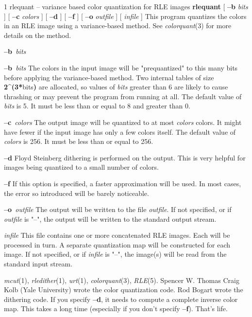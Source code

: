%
%
%
 1
rlequant -- variance based color quantization for RLE images
{\bf rlequant}
[
{\bf --b}
{\it bits}
] [
{\bf --c}
{\it colors}
] [
{\bf --d}
] [
{\bf --f}
] [
{\bf --o}
{\it outfile}
] [ 
{\it infile}
] 
This program quantizes the colors in an RLE image using a
variance-based method.  See 
{\it colorquant}{\rm (3)}
for more details on the method.
\begin{TPlist}{{\bf --b}{\it \ bits}
}
\item[{{\bf --b}{\it \ bits}
}]
The colors in the input image will be "prequantized" to this many bits
before applying the variance-based method.  Two internal tables of
size 
{\bf 2\^{}(3*}{\rm bits}{\bf )}
are allocated, so values of
{\it bits}
greater than 6 are likely to cause thrashing or may prevent the
program from running at all.  The default value of
{\it bits}
is 5.  It must be less than or equal to 8 and greater than 0.
\item[{{\bf --c}{\it \ colors}
}]
The output image will be quantized to at most
{\it colors}
colors.  It might have fewer if the input image has only a few colors
itself.  The default value of
{\it colors}
is 256.  It must be less than or equal to 256.
\item[{{\bf --d}}]
Floyd Steinberg dithering is performed on the output.  This is very helpful
for images being quantized to a small number of colors.
\item[{{\bf --f}}]
If this option is specified, a faster approximation will be used.  In
most cases, the error so introduced will be barely noticeable.
\item[{{\bf --o}{\it \ outfile}
}]
The output will be written to the file
{\it outfile}{\rm .}
If not specified, or if
{\it outfile}
is "--", the output will be written to the standard output stream.
\item[{{\it infile}}]
This file contains one or more concatenated RLE images.  Each will be
processed in turn.  A separate quantization map will be constructed
for each image.  If not specified, or if
{\it infile}
is "--", the image(s) will be read from the standard input stream.
\end{TPlist}
{\it mcut}{\rm (1),}
{\it rledither}{\rm (1),}
{\it urt}{\rm (1),}
{\it colorquant}{\rm (3),}
{\it RLE}{\rm (5).}
Spencer W. Thomas
\nwl
Craig Kolb (Yale University) wrote the color quantization code.
\nwl
Rod Bogart wrote the dithering code.
If you specify 
{\bf --d}{\rm ,}
it needs to compute a complete inverse color map.  This takes a long
time (especially if you don't specify
{\bf --f}{\rm ).}
That's life.  
\newpage


